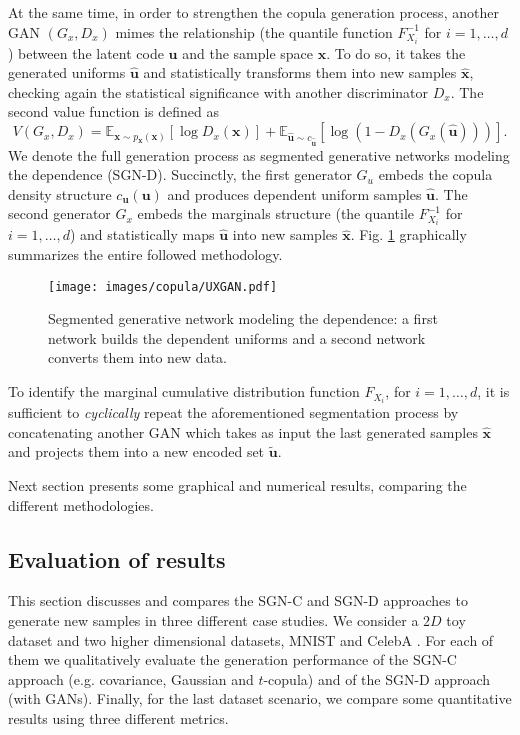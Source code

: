 At the same time, in order to strengthen the copula generation process,  another GAN $(G_x, D_x)$ mimes the relationship (the quantile function $F_{X_i}^{-1}$ for $i=1,\dots,d$) between the latent code $\mathbf{u}$ and the sample space $\mathbf{x}$. To do so, it takes the generated uniforms $\mathbf{\hat{u}}$ and statistically transforms them into new samples $\mathbf{\hat{x}}$, checking again the statistical significance with another discriminator $D_x$. The second value function is defined as
\begin{equation}
V(G_x,D_x) = \mathbb{E}_{\mathbf{x} \sim p_{\mathbf{x}}(\mathbf{x})}[\log D_x(\mathbf{x})]
 + \mathbb{E}_{\mathbf{\hat{u}} \sim c_{\mathbf{\hat{u}}}}[\log(1-D_x(G_x(\mathbf{\hat{u}})))].
\label{eq:sgn_V2}
\end{equation}
We denote the full generation process as segmented generative networks modeling the dependence (SGN-D). Succinctly, the first generator $G_u$ embeds the copula density structure $c_{\mathbf{u}}(\mathbf{u})$ and produces dependent uniform samples $\mathbf{\hat{u}}$. The second generator $G_x$ embeds the marginals structure (the quantile $F_{X_i}^{-1}$ for $i=1,\dots,d$) and statistically maps $\mathbf{\hat{u}}$ into new samples $\mathbf{\hat{x}}$.
Fig. \ref{fig:sgn_UXGAN} graphically summarizes the entire followed methodology. 

\begin{figure}
\centering
\texttt{[image: images/copula/UXGAN.pdf]}
\caption{Segmented generative network modeling the dependence: a first network builds the dependent uniforms and a second network converts them into new data.}
\label{fig:sgn_UXGAN}
\end{figure}

To identify the marginal cumulative distribution function $F_{X_i}$, for $i=1,\dots, d$, it is sufficient to \textit{cyclically} repeat the aforementioned segmentation process by concatenating another GAN which takes as input the last generated samples $\mathbf{\hat{x}}$ and projects them into a new encoded set $\mathbf{\tilde{u}}$.  

Next section presents some graphical and numerical results, comparing the different methodologies.

\subsection{Evaluation of results}
\label{subsec:sgn_evaluation_of_results}
This section discusses and compares the SGN-C and SGN-D approaches to generate new samples in three different case studies. We consider a $2D$ toy dataset and two higher dimensional datasets, MNIST \cite{MNIST} and CelebA \cite{CelebA}. For each of them we qualitatively evaluate the generation performance of the SGN-C approach (e.g. covariance, Gaussian and $t$-copula) and of the SGN-D approach (with GANs). Finally, for the last dataset scenario, we compare some quantitative results using three different metrics. 

